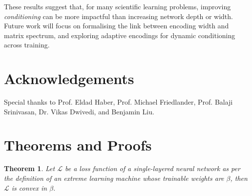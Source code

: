 \documentclass{article}
\newtheorem{theorem}{Theorem}[section]
\begin{document}
These results suggest that, for many scientific learning problems, improving \emph{conditioning} can be more impactful than increasing network depth or width. Future work will focus on formalising the link between encoding width and matrix spectrum, and exploring adaptive encodings for dynamic conditioning across training.

\section*{Acknowledgements}
Special thanks to Prof. Eldad Haber, Prof. Michael Friedlander, Prof. Balaji Srinivasan, Dr. Vikas Dwivedi, and Benjamin Liu.




\clearpage

\appendix
\section{Theorems and Proofs}
\begin{theorem}
Let \(\mathcal{L}\) be a loss function of a single-layered neural network as per the definition of an extreme learning machine whose trainable weights are \(\beta\), then \(\mathcal{L}\) is convex in \(\beta\).
\end{theorem}
\end{document}

